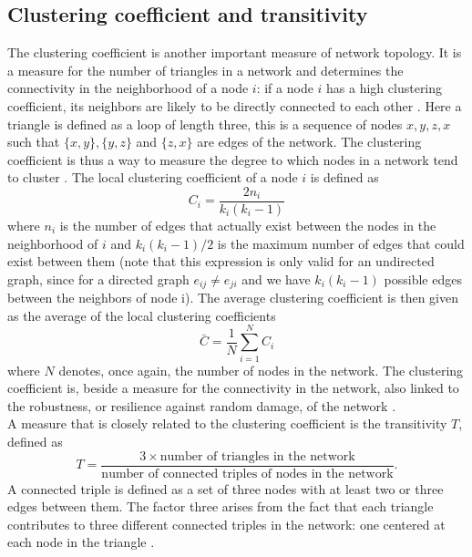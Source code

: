 \documentclass[11 pt , letterpaper , twoside , openright]{book}
\begin{document}
\subsection{Clustering coefficient and transitivity}

The clustering coefficient is another important measure of network topology. It is a measure for the number of triangles in a network and determines the connectivity in the neighborhood of a node $i$: if a node $i$ has a high clustering coefficient, its neighbors are likely to be directly connected to each other \cite{Li2017}. Here a triangle is defined as a loop of length three, this is a sequence of nodes $x, y, z, x$ such that $\{x, y\}, \{y, z\}$ and $\{z, x\}$ are edges of the network. The clustering coefficient is thus a way to measure the degree to which nodes in a network tend to cluster \cite{Li2017}. The local clustering coefficient of a node $i$ is defined as
\begin{equation}
	C_i = \frac{2n_i}{k_i(k_i-1)}
\end{equation}
where $n_i$ is the number of edges that actually exist between the nodes in the neighborhood of $i$ and $k_i(k_i-1)/2$ is the maximum number of edges that could exist between them (note that this expression is only valid for an undirected graph, since for a directed graph $e_{ij} \neq e_{ji}$ and we have $k_i(k_i-1)$ possible edges between the neighbors of node i). %
The average clustering coefficient is then given as the average of the local clustering coefficients
\begin{equation}
	\bar{C} = \frac{1}{N}\sum_{i = 1}^N C_i
\end{equation}
where $N$ denotes, once again, the number of nodes in the network. The clustering coefficient is, beside a measure for the connectivity in the network, also linked to the robustness, or resilience against random damage,  of the network \cite{Li2017} \cite{Iyer2013}. \\
A measure that is closely related to the clustering coefficient is the transitivity $T$, defined as \cite{F.Costa2007}
\begin{equation}
	T = \frac{3 \times \text{number of triangles in the network}}{\text{number of connected triples of nodes in the network}}.
\end{equation}
A connected triple is defined as a set of three nodes with at least two or three edges between them. The factor three arises from the fact that each triangle contributes to three different connected triples in the network: one centered at each node in the triangle \cite{F.Costa2007}. 
 
\end{document}
